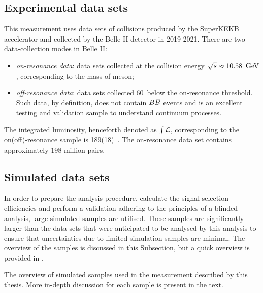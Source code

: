 
\subsection{Experimental data sets}\label{sec:data}

This measurement uses data sets of \epem collisions produced by the SuperKEKB accelerator and collected by the Belle II detector in 2019-2021.
There are two data-collection modes in Belle II:
\begin{itemize}
    \item \textit{on-resonance data}: data sets collected at the collision energy $\sqrt{s}\approx10.58~\mathrm{\,Ge\kern -0.1em V}$, corresponding to the mass of \FourS meson;
    \item \textit{off-resonance data}: data sets collected 60~\mev below the on-resonance threshold. 
    Such data, by definition, does not contain $B\kern 0.18em\overline{\kern -0.18em B}{}$ events and is an excellent testing and validation sample to understand continuum processes.
\end{itemize}
The integrated luminosity, henceforth denoted as $\int~\hspace{-7pt}~\mathcal{L}$, corresponding to the on(off)-resonance sample is 189(18)~\invfb.
The on-resonance data set contains approximately $198$ million \BB pairs.

\subsection{Simulated data sets}\label{sec:MC}

In order to prepare the analysis procedure, calculate the signal-selection efficiencies and perform a validation adhering to the principles of a blinded analysis, 
large simulated samples are utilised.
These samples are significantly larger than the data sets that were anticipated to be analysed by this analysis to ensure that uncertainties due to limited simulation samples are minimal.
The overview of the samples is discussed in this Subsection, but a quick overview is provided in .

\begin{table}[htbp!]
    \centering
\caption{\label{tab:simulated_samples}The overview of simulated samples used in the measurement described by this thesis.
More in-depth discussion for each sample is present in the text.}

\end{table}

